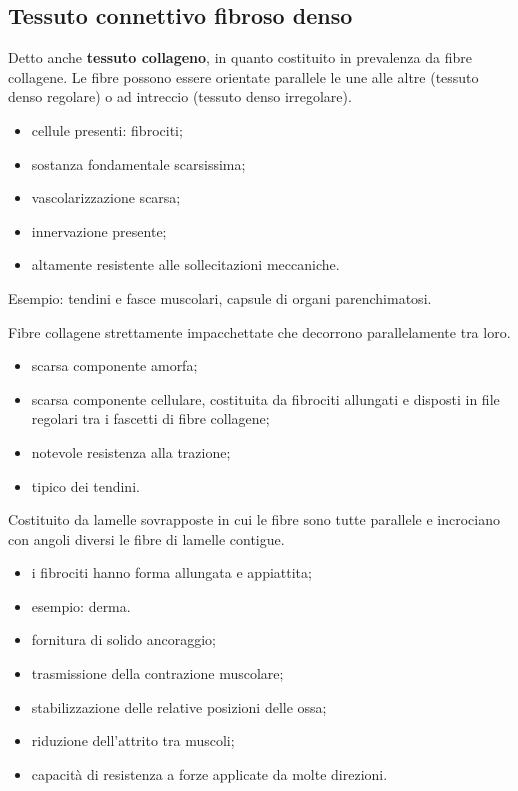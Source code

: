 \subsection{Tessuto connettivo fibroso denso}

Detto anche \textbf{tessuto collageno}, in quanto costituito in prevalenza da fibre collagene. Le fibre possono essere orientate parallele le une alle altre (tessuto denso regolare) o ad intreccio (tessuto denso irregolare).
\begin{itemize}
  \item cellule presenti: fibrociti;
  \item sostanza fondamentale scarsissima;
  \item vascolarizzazione scarsa;
  \item innervazione presente;
  \item altamente resistente alle sollecitazioni meccaniche.
\end{itemize}
Esempio: tendini e fasce muscolari, capsule di organi parenchimatosi.

Fibre collagene strettamente impacchettate che decorrono parallelamente tra loro.
\begin{itemize}
  \item scarsa componente amorfa;
  \item scarsa componente cellulare, costituita da fibrociti allungati e disposti in file regolari tra i fascetti di fibre collagene;
  \item notevole resistenza alla trazione;
  \item tipico dei tendini.
\end{itemize}

Costituito da lamelle sovrapposte in cui le fibre sono tutte parallele e incrociano con angoli diversi le fibre di lamelle contigue.
\begin{itemize}
  \item i fibrociti hanno forma allungata e appiattita;
  \item esempio: derma.
\end{itemize}

\begin{itemize}
  \item fornitura di solido ancoraggio;
  \item trasmissione della contrazione muscolare;
  \item stabilizzazione delle relative posizioni delle ossa;
  \item riduzione dell'attrito tra muscoli;
  \item capacità di resistenza a forze applicate da molte direzioni.
\end{itemize}

